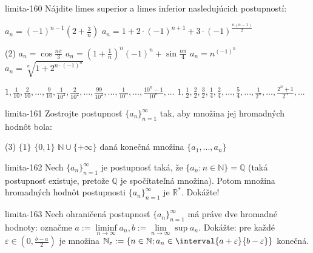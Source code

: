 \begin{defproblem}{limita-160}
Nájdite limes superior a limes inferior nasledujúcich postupností:
\begin{tasks}
    \task $a_n=(-1)^{n-1}(2+\frac{3}{n})$
    \task $a_n=1+2 \cdot (-1)^{n+1}+3 \cdot (-1)^{\frac{n(n-1)}{2}}$
\end{tasks}
\begin{tasks}[resume](2)
    \task $a_n=\cos \frac{n \pi}{3}$
    \task $a_n=(1+\frac{1}{n})^n(-1)^n+\sin \frac{n \pi}{4}$
    \task $a_n=n^{(-1)^n}$
    \task $a_n=\sqrt[n]{1+2^{n \cdot (-1)^n}}$
\end{tasks}
\begin{tasks}[resume]
    \task $1,\frac{1}{10},\frac{2}{10},...,\frac{9}{10},\frac{1}{10^2},\frac{2}{10^2},...,\frac{99}{10^2},...,\frac{1}{10^n},...,\frac{10^n-1}{10^n},...$
    \task $1,\frac{1}{2},\frac{2}{2},\frac{3}{2},\frac{1}{4},\frac{2}{4},...,\frac{5}{4},...,\frac{1}{2^n},...,\frac{2^n+1}{2^n},... $
\end{tasks}
\end{defproblem}

\begin{defproblem}{limita-161}
Zostrojte postupnosť ${\{a_n\}}_{n=1}^\infty$ tak, aby množina jej hromadných
hodnôt bola:
\begin{tasks}(3)
\task $\{ 1\}$
\task $\{ 0,1\}$
\task $\mathbb{N} \cup \{ +\infty \}$
\task* daná konečná množina $\{ a_1,...,a_n\}$
\end{tasks}
\end{defproblem}

\begin{defproblem}{limita-162}
Nech ${\{a_n\}}_{n=1}^\infty$ je postupnosť taká, že $\{ a_n: n \in \mathbb{N}
\}=\mathbb{Q}$ (taká postupnosť existuje, pretože $\mathbb{Q}$ je spočítateľná
množina). Potom množina hromadných hodnôt postupnosti ${\{a_n\}}_{n=1}^\infty$
je $\mathbb{R^*}$. Dokážte!
\end{defproblem}

\begin{defproblem}{limita-163}
Nech ohraničená postupnosť ${\{a_n\}}_{n=1}^\infty$ má práve dve hromadné
hodnoty: označme $a := \liminf\limits_{n \rightarrow \infty} a_n,b :=
\lim\limits_{n \rightarrow \infty} \sup a_n$. Dokážte: pre každé $\varepsilon \in
(0,\frac{b-a}{2})$ je množina $\mathbb{N_\varepsilon} := \{n \in \mathbb{N}; a_n
\in \interval{a + \varepsilon}{b - \varepsilon} \}$ konečná.
\end{defproblem}

